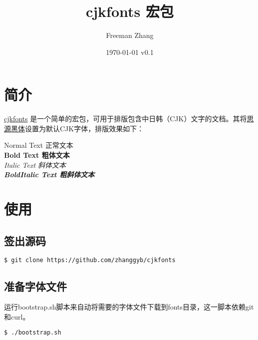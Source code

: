 \documentclass[oneside,final]{article}
\begin{document}
\title{cjkfonts 宏包}
\author{Freeman Zhang}
\date{\today{} v0.1}

\maketitle

\section{简介}

\href{https://github.com/zhanggyb/cjkfonts}{cjkfonts} 是一个简单的\XeLaTeX{}宏包，可用于排版包含中日韩（CJK）文字的文档。其将\href{https://github.com/adobe-fonts/source-han-sans}{思源黑体}设置为默认CJK字体，排版效果如下：

\begin{center}
  Normal Text {\SourceHanSansSC 正常文本} \\
  \vspace{1em}
  \textbf{Bold Text {\SourceHanSansSC 粗体文本}} \\
  \vspace{1em}
  \textit{Italic Text {\SourceHanSansSC 斜体文本}} \\
  \vspace{1em}
  \textbf{\textit{BoldItalic Text {\SourceHanSansSC 粗斜体文本}}}
\end{center}

\section{使用}

\subsection{签出源码}

\begin{lstlisting}[language=sh]
$ git clone https://github.com/zhanggyb/cjkfonts
\end{lstlisting}

\subsection{准备字体文件}

运行bootstrap.sh脚本来自动将需要的字体文件下载到fonts目录，这一脚本依赖git和curl。

\begin{lstlisting}[language=sh]
$ ./bootstrap.sh
\end{lstlisting}
\end{document}
